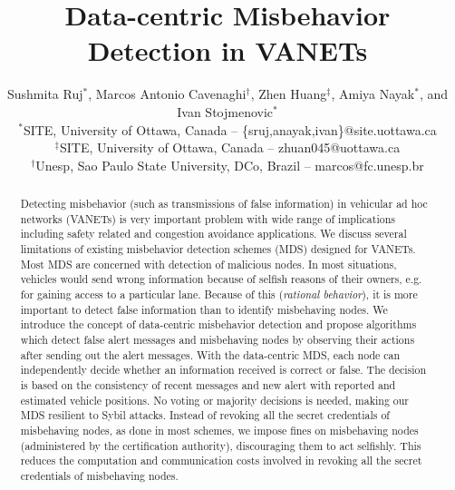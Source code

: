 \documentclass[conference]{IEEEtran}[10pt]
\begin{document}
\title{Data-centric Misbehavior Detection in VANETs}
\author{Sushmita Ruj$^*$, Marcos Antonio Cavenaghi$^\dag$, Zhen Huang$^\ddag$, Amiya Nayak$^*$, and Ivan Stojmenovic$^*$\\ 
$^*$SITE, University of Ottawa, Canada -- \{sruj,anayak,ivan\}@site.uottawa.ca\\
$^\ddag$SITE, University of Ottawa, Canada -- zhuan045@uottawa.ca\\
$^\dag$Unesp, Sao Paulo State University, DCo, Brazil -- marcos@fc.unesp.br}
\maketitle

\newcommand{\ot}{\otimes}
\newcommand{\m}{\mu}
\renewcommand{\l}{\lambda}
\newtheorem{definition}{Definition}
\newtheorem{construction}{Construction}
\newtheorem{theorem}{Theorem}
\newtheorem{question}{Question}
\newtheorem{lemma}{Lemma}
\newtheorem{proposition}{Proposition}
\newtheorem{remark}{Remark}
\newtheorem{corollary}{Corollary}
\newtheorem{example}{Example}

\begin{abstract}
Detecting misbehavior (such as transmissions of false information) in vehicular ad hoc networks (VANETs) is very important problem with wide range of implications including safety related and congestion avoidance applications.
We discuss several limitations of existing misbehavior detection schemes (MDS) designed for VANETs.
Most MDS are concerned with detection of malicious nodes. 
In most situations, vehicles would send wrong information because of selfish reasons of their owners, e.g. for
gaining access to a particular lane.
Because of this (\emph{rational behavior}), it is more important to detect false information than to identify misbehaving nodes. 
We introduce the concept of data-centric misbehavior detection and 
propose algorithms which detect false alert messages and
misbehaving nodes by observing their actions after sending out the alert messages.
With the data-centric MDS, each node can independently decide whether an  information received is correct or false. The decision is based on the consistency of recent messages and new alert with reported and estimated vehicle positions.
No voting or majority decisions is needed, making our MDS resilient to Sybil attacks.
Instead of revoking all the secret credentials of misbehaving nodes, as done in most schemes,
we impose fines on misbehaving nodes (administered by the certification authority), discouraging them to act selfishly.
This reduces the computation and communication costs involved in revoking all the secret credentials of misbehaving nodes.

\end{abstract}
\end{document}
